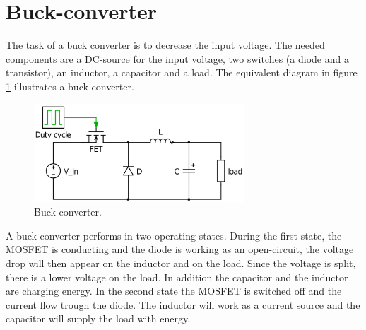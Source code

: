 \section{Buck-converter\label{Buck-C}}

The task of a buck converter is to decrease the input voltage. The needed components are a DC-source for the input voltage, two switches (a diode and a transistor), an inductor, a capacitor and a load. The equivalent diagram in figure \ref{Buck-converter} illustrates a buck-converter. 

\begin{figure}[htbp]
	\begin{center}
		\includegraphics[width=0.7\textwidth]{../Pictures/Buck-converter}
		\caption{Buck-converter.}
		\label{Buck-converter}
	\end{center}	
\end{figure}

A buck-converter performs in two operating states. 
During the first state, the MOSFET is conducting and the diode is working as an open-circuit, the voltage drop will then appear on the inductor and on the load. Since the voltage is split, there is a lower voltage on the load. In addition the capacitor and the inductor are charging energy. In the second state the MOSFET is switched off and the current flow trough the diode. The inductor will work as a current source and %
the capacitor will supply the load with energy\cite{schematicbuckandboost}.

